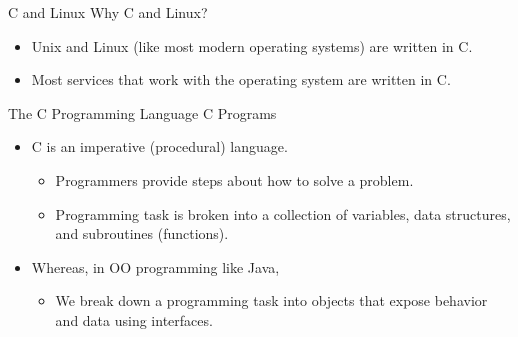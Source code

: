 \documentclass[10pt]{beamer}
\begin{document}
\begin{frame}[fragile]{C and Linux}
Why C and Linux?
    \begin{itemize}
        \item Unix and Linux (like most modern operating systems) are written in C.

        \item Most services that work with the operating system are written in C.
    \end{itemize}
\end{frame}
\begin{frame}[fragile]{The C Programming Language}
C Programs
    \begin{itemize}
        \item C is an imperative (procedural) language.
        \begin{itemize}
			\item Programmers provide steps about how to solve a problem.
			\item Programming task is broken into a collection of variables, data structures, and subroutines (functions).
		\end{itemize}
		\item Whereas, in OO programming like Java, 
		\begin{itemize}
			\item We break down a programming task into objects that expose behavior and data using interfaces.
		\end{itemize}

    \end{itemize}
\end{frame}
\end{document}
